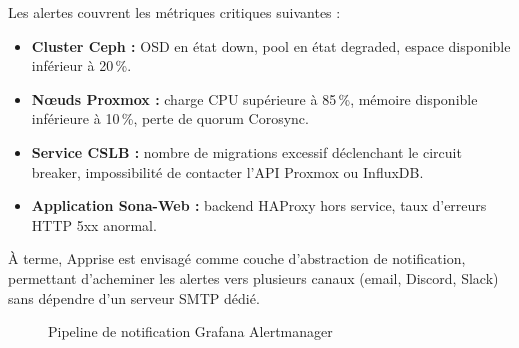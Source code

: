 \par Les alertes couvrent les métriques critiques suivantes :\\

\begin{itemize}
    \item \textbf{Cluster Ceph :} OSD en état down, pool en état degraded, espace disponible inférieur à 20\,\%.
    \item \textbf{Nœuds Proxmox :} charge CPU supérieure à 85\,\%, mémoire disponible inférieure à 10\,\%, perte de quorum Corosync.
    \item \textbf{Service CSLB :} nombre de migrations excessif déclenchant le circuit breaker, impossibilité de contacter l'API Proxmox ou InfluxDB.
    \item \textbf{Application Sona-Web :} backend HAProxy hors service, taux d'erreurs HTTP 5xx anormal.
\end{itemize}

\par À terme, Apprise est envisagé comme couche d'abstraction de notification, permettant d'acheminer les alertes vers plusieurs canaux (email, Discord, Slack) sans dépendre d'un serveur SMTP dédié.

\begin{figure}[H]
\centering
{}
\caption{Pipeline de notification Grafana Alertmanager}
\label{fig:alertmanager-pipeline}
\end{figure}


